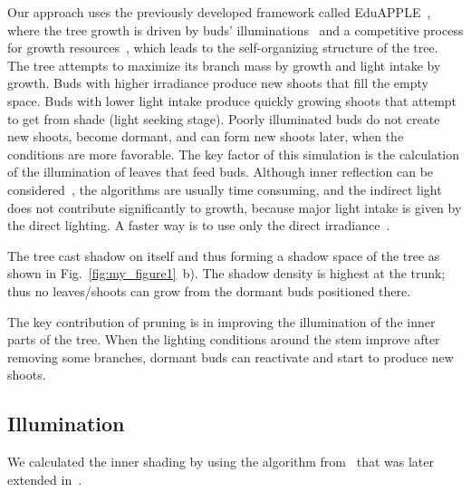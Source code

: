 Our approach uses the previously developed framework called EduAPPLE~\cite{kohek_eduapple:_2015},
where the tree growth is driven by buds' illuminations~\cite{benes_efficient_1996,benes_visual_1997,mech_visual_1996} and a competitive process for growth resources~\cite{alsweis_modeling_2005,arvo_modeling_1988,palubicki_self-organizing_2009,runions_modeling_2007}, which leads to the self-organizing structure of the tree. 
The tree attempts to maximize its branch mass by growth and light intake by
growth. Buds with higher irradiance produce new shoots that fill the
empty space. Buds with lower light intake produce quickly growing shoots
that attempt to get from shade (light seeking stage). Poorly illuminated buds do not create new shoots, become dormant, and can form new shoots later, when the conditions are more favorable. The key factor of this simulation is the calculation of the illumination of leaves that feed buds. Although inner reflection can be considered~\cite{soler_efficient_2003},
the algorithms are usually time consuming, and the indirect light does
not contribute significantly to growth, because major light intake is
given by the direct lighting. A faster way is to use only the direct
irradiance~\cite{benes_efficient_1996,benes_visual_1997,mech_visual_1996,pirk_plastic_2012}. 

The tree cast shadow on itself and thus
forming a shadow space of the tree as shown in Fig.~\ref{fig:my_figure1}~b). The shadow
density is highest at the trunk; thus no leaves/shoots can grow from the
dormant buds positioned there.  

The key contribution of pruning is in
improving the illumination of the inner parts of the tree. When the
lighting conditions around the stem improve after removing some
branches, dormant buds can reactivate and start to produce new shoots.


\subsection{Illumination}
We calculated the inner shading by using the algorithm from~\cite{palubicki_self-organizing_2009}
that was later extended in~\cite{pirk_plastic_2012,stava_inverse_2014,strnad_novel_2017}. 

